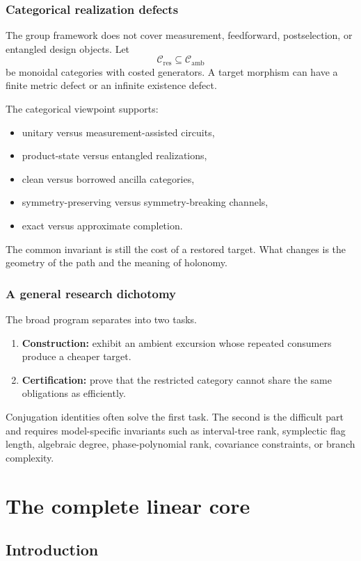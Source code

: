 \subsection{Categorical realization defects}
The group framework does not cover measurement, feedforward, postselection, or entangled design objects.  Let
\[
\mathcal C_{\mathrm{res}}
\subseteq
\mathcal C_{\mathrm{amb}}
\]
be monoidal categories with costed generators.  A target morphism can have a finite metric defect or an infinite existence defect.

The categorical viewpoint supports:
\begin{itemize}
\item unitary versus measurement-assisted circuits,
\item product-state versus entangled realizations,
\item clean versus borrowed ancilla categories,
\item symmetry-preserving versus symmetry-breaking channels,
\item exact versus approximate completion.
\end{itemize}
The common invariant is still the cost of a restored target.  What changes is the geometry of the path and the meaning of holonomy.

\subsection{A general research dichotomy}
The broad program separates into two tasks.
\begin{enumerate}
\item \textbf{Construction:} exhibit an ambient excursion whose repeated consumers produce a cheaper target.
\item \textbf{Certification:} prove that the restricted category cannot share the same obligations as efficiently.
\end{enumerate}
Conjugation identities often solve the first task.  The second is the difficult part and requires model-specific invariants such as interval-tree rank, symplectic flag length, algebraic degree, phase-polynomial rank, covariance constraints, or branch complexity.

\chapter{The complete linear core}
\section{Introduction}

